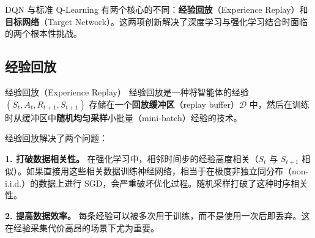 DQN 与标准 Q-Learning 有两个核心的不同：\textbf{经验回放}（Experience Replay）和\textbf{目标网络}（Target Network）。这两项创新解决了深度学习与强化学习结合时面临的两个根本性挑战。

\subsection{经验回放}

\begin{mydefinition}{经验回放（Experience Replay）}
经验回放是一种将智能体的经验 $(S_t, A_t, R_{t+1}, S_{t+1})$ 存储在一个\textbf{回放缓冲区}（replay buffer）$\mathcal{D}$ 中，然后在训练时从缓冲区中\textbf{随机均匀采样}小批量（mini-batch）经验的技术。
\end{mydefinition}

经验回放解决了两个问题：

\textbf{1. 打破数据相关性。} 在强化学习中，相邻时间步的经验高度相关（$S_t$ 与 $S_{t+1}$ 相似）。如果直接用这些相关数据训练神经网络，相当于在极度非独立同分布（non-i.i.d.）的数据上进行 SGD，会严重破坏优化过程。随机采样打破了这种时序相关性。

\textbf{2. 提高数据效率。} 每条经验可以被多次用于训练，而不是使用一次后即丢弃。这在经验采集代价高昂的场景下尤为重要。

